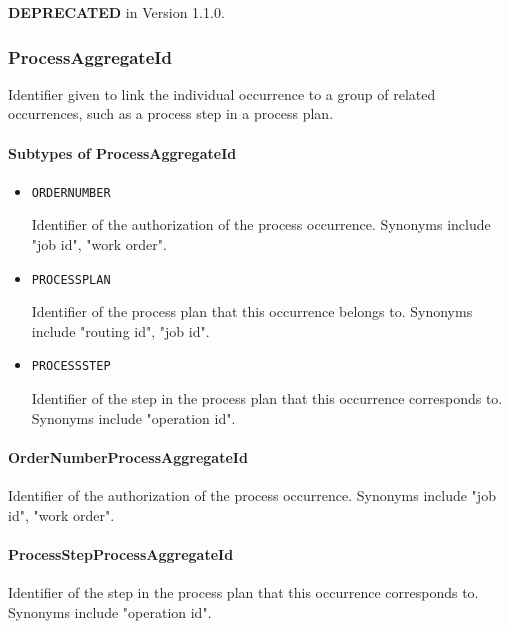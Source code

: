 \textbf{DEPRECATED} in Version 1.1.0.


\subsubsection{ProcessAggregateId}
\label{sec:ProcessAggregateId}



Identifier given to link the individual occurrence to a group of related occurrences, such as a process step in a process plan.


\paragraph{Subtypes of ProcessAggregateId}\mbox{}
\label{sec:Subtypes of ProcessAggregateId}

\begin{itemize}

\item \texttt{ORDER\textunderscore NUMBER}


Identifier of the authorization of the process occurrence. Synonyms include "job id", "work order".

\item \texttt{PROCESS\textunderscore PLAN}


Identifier of the process plan that this occurrence belongs to. Synonyms include "routing id", "job id".


\item \texttt{PROCESS\textunderscore STEP}


Identifier of the step in the process plan that this occurrence corresponds to. Synonyms include "operation id".


\end{itemize}

\paragraph{OrderNumberProcessAggregateId}\mbox{}
\label{sec:OrderNumberProcessAggregateId}


Identifier of the authorization of the process occurrence. Synonyms include "job id", "work order".


\paragraph{ProcessStepProcessAggregateId}\mbox{}
\label{sec:ProcessStepProcessAggregateId}


Identifier of the step in the process plan that this occurrence corresponds to. Synonyms include "operation id".


